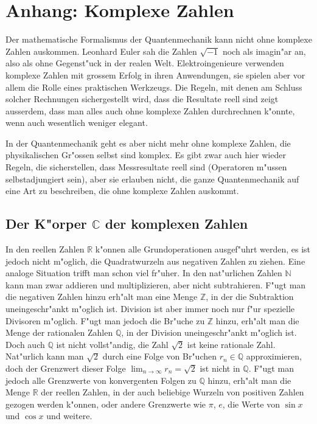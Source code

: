 \chapter{Anhang: Komplexe Zahlen}
\rhead{}
Der mathematische Formalismus der Quantenmechanik kann nicht ohne komplexe
Zahlen auskommen.
Leonhard Euler sah die Zahlen $\sqrt{-1}$ noch als imagin"ar an,
also als ohne Gegenst"uck in der realen Welt.
Elektroingenieure verwenden komplexe Zahlen mit grossem Erfolg in ihren
Anwendungen, sie spielen aber vor allem die Rolle eines praktischen
Werkzeugs. Die Regeln, mit denen am Schluss solcher Rechnungen sichergestellt
wird, dass die Resultate reell sind zeigt ausserdem, dass man alles auch
ohne komplexe Zahlen durchrechnen k"onnte, wenn auch wesentlich weniger
elegant.

In der Quantenmechanik geht es aber nicht mehr ohne komplexe Zahlen,
die physikalischen Gr"ossen selbst sind komplex. Es gibt zwar auch
hier wieder Regeln, die sicherstellen, dass Messresultate reell sind
(Operatoren m"ussen selbstadjungiert sein), aber sie erlauben nicht,
die ganze Quantenmechanik auf eine Art zu beschreiben, die ohne komplexe
Zahlen auskommt.

\section{Der K"orper $\mathbb C$ der komplexen Zahlen}
In den reellen Zahlen $\mathbb R$ k"onnen alle Grundoperationen ausgef"uhrt
werden, es ist jedoch nicht m"oglich, die Quadratwurzeln aus negativen
Zahlen zu ziehen. Eine analoge Situation trifft man schon viel fr"uher.
In den nat"urlichen Zahlen $\mathbb N$ kann man zwar addieren und
multiplizieren, aber nicht subtrahieren.
F"ugt man die negativen Zahlen hinzu erh"alt man eine Menge $\mathbb Z$,
in der die Subtraktion uneingeschr"ankt m"oglich ist. Division ist aber
immer noch nur f"ur spezielle Divisoren m"oglich. F"ugt man jedoch die
Br"uche zu $\mathbb Z$ hinzu, erh"alt man die Menge der rationalen Zahlen
$\mathbb Q$, in der Division uneingeschr"ankt m"oglich ist.
Doch auch $\mathbb Q$ ist nicht vollst"andig, die Zahl $\sqrt{2}$ ist
keine rationale Zahl. Nat"urlich kann man $\sqrt{2}$ durch eine
Folge von Br"uchen $r_n\in\mathbb Q$ approximieren, doch der Grenzwert
dieser Folge $\lim_{n\to\infty}r_n=\sqrt{2}$ ist nicht in $\mathbb Q$.
F"ugt man jedoch alle Grenzwerte von konvergenten Folgen zu $\mathbb Q$
hinzu, erh"alt man die Menge $\mathbb R$ der reellen Zahlen, in der
auch beliebige Wurzeln von positiven Zahlen gezogen werden k"onnen,
oder andere Grenzwerte wie $\pi$, $e$, die Werte von $\sin x$ und $\cos x$
und weitere.

